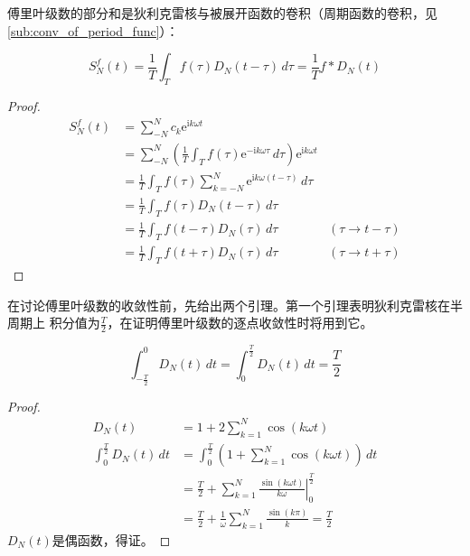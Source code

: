 \documentclass{ctexbook}
\begin{document}
傅里叶级数的部分和是狄利克雷核与被展开函数的卷积（周期函数的卷积，见\ref{sub:conv_of_period_func}）：
\begin{proposition}
    \[S_N^f(t)=\frac{1}{T}\int_{T}f(\tau)D_N(t-\tau)\,d\tau=\frac{1}{T}f*D_N(t)\]
\end{proposition}
\begin{proof}
    \begin{align*}
    S_N^f(t) & =\sum_{-N}^{N}c_k \mathrm{e}^{\mathrm{i}k\omega t}\\
             & =\sum_{-N}^{N}\left(\frac{1}{T}\int_{T}f(\tau)\mathrm{e}^{-\mathrm{i}k\omega \tau}\,d\tau\right) \mathrm{e}^{\mathrm{i}k\omega t}\\
             & =\frac{1}{T}\int_{T}f(\tau)\sum_{k=-N}^{N}\mathrm{e}^{\mathrm{i}k\omega (t-\tau)}\,d\tau\\
             & =\frac{1}{T}\int_{T}f(\tau)D_N(t-\tau)\,d\tau\\
             & =\frac{1}{T}\int_{T}f(t-\tau)D_N(\tau)\,d\tau                                                & (\tau\to t-\tau)\\
             & =\frac{1}{T}\int_{T}f(t+\tau)D_N(\tau)\,d\tau                                                & (\tau\to t+\tau)
\end{align*}
\end{proof}

在讨论傅里叶级数的收敛性前，先给出两个引理。第一个引理表明狄利克雷核在半周期上
积分值为$\frac{T}{2}$，在证明傅里叶级数的逐点收敛性时将用到它。
\begin{lemma}
    $$\int_{-\frac{T}{2}}^{0}D_N(t)\,dt=\int_{0}^{\frac{T}{2}}D_N(t)\,dt=\frac{T}{2}$$
\end{lemma}
\begin{proof}
    \begin{align*}
    D_N(t)&=1+2\sum_{k=1}^{N}\cos(k\omega t)\\
    \int_{0}^{\frac{T}{2}}D_N(t)\,dt & =\int_{0}^{\frac{T}{2}}\left(1+\sum_{k=1}^{N}\cos(k\omega t)\right)\,dt                              \\
                                     & =\frac{T}{2}+\sum_{k=1}^{N}\left.\frac{\sin(k\omega t)}{k\omega}\right|_{0}^{\frac{T}{2}} \\
                                     & =\frac{T}{2}+\frac{1}{\omega}\sum_{k=1}^{N}\frac{\sin(k\pi)}{k}=\frac{T}{2}               
\end{align*}
$D_N(t)$是偶函数，得证。
\end{proof}
\end{document}
